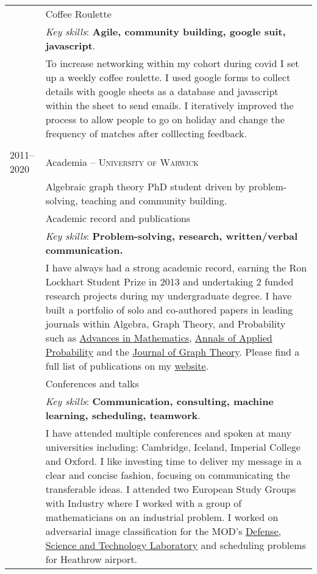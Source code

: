 \documentclass[a4paper,10pt]{article}
\newcommand{\tab}{\hspace{10 pt}}
\begin{document}
\begin{tabular}{p{2.25cm}|p{15cm}}
	 & \tab Coffee Roulette\\
	 & \footnotesize{\emph{Key skills}: \textbf{Agile, community building, google suit, javascript}.}\\
	 &	\footnotesize{To increase networking within my cohort during covid I set up a weekly coffee roulette. I used google forms to collect details with google sheets as a database and javascript within the sheet to send emails. I iteratively improved the process to allow people to go on holiday and change the frequency of matches after colllecting feedback.}\\
\multicolumn{2}{c}{} \\
%
%
	\textsc{2011--2020} & Academia -- \textsc{University of Warwick}\\
	 & \footnotesize{Algebraic graph theory PhD student driven by problem-solving, teaching and community building.}\\
	 & \tab Academic record and publications\\
	 & \footnotesize{\emph{Key skills}: \textbf{Problem-solving, research, written/verbal communication.}}\\
	 &	\footnotesize{I have always had a strong academic record, earning the Ron Lockhart Student Prize in 2013 and undertaking 2 funded research projects during my undergraduate degree. I have built a portfolio of solo and co-authored papers in leading journals within Algebra, Graph Theory, and Probability such as \href{https://www.sciencedirect.com/science/article/pii/S0001870818303347}{Advances in Mathematics}, \href{https://projecteuclid.org/journals/annals-of-applied-probability/volume-32/issue-1/From-the-Bernoulli-factory-to-a-dice-enterprise-via-perfect/10.1214/21-AAP1679.short}{Annals of Applied Probability} and the \href{http://onlinelibrary.wiley.com/doi/10.1002/jgt.22002/abstract}{Journal of Graph Theory}. Please find a full list of publications on my \href{https://warwick.ac.uk/fac/sci/maths/people/staff/wendland/}{website}.}\vspace{0.05 in}\\	
	 & \tab Conferences and talks\\
	 & \footnotesize{\emph{Key skills}: \textbf{Communication, consulting, machine learning, scheduling, teamwork}.}\\
	 &	\footnotesize{I have attended multiple conferences and spoken at many universities including: Cambridge, Iceland, Imperial College and Oxford. I like investing time to deliver my message in a clear and concise fashion, focusing on communicating the transferable ideas. I attended two European Study Groups with Industry where I worked with a group of mathematicians on an industrial problem. I worked on adversarial image classification for the MOD's \href{https://www.gov.uk/government/organisations/defence-science-and-technology-laboratory}{Defense, Science and Technology Laboratory} and scheduling problems for Heathrow airport.}\vspace{0.05 in}\\	

\end{tabular}
\end{document}
